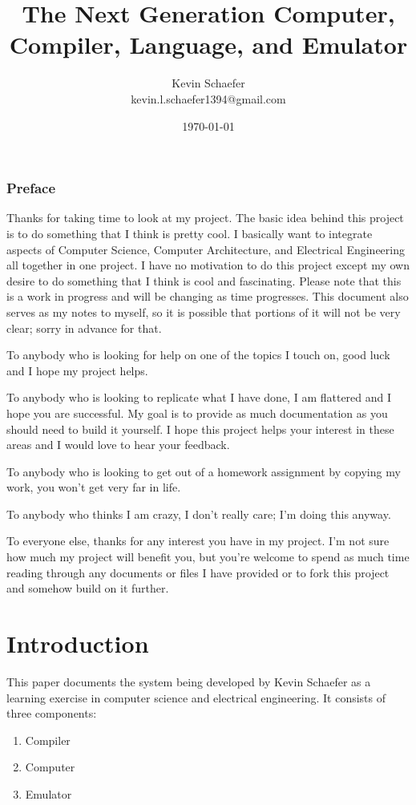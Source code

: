\documentclass{book}
\title{The Next Generation Computer, Compiler, Language, and Emulator}
\date{\today}
\author{Kevin Schaefer \\ kevin.l.schaefer1394@gmail.com}
\begin{document}
\maketitle

\subsection*{Preface}
Thanks for taking time to look at my project. The basic idea behind this
project is to do something that I think is pretty cool. I basically want
to integrate aspects of Computer Science, Computer Architecture, and
Electrical Engineering all together in one project. I have no motivation
to do this project except my own desire to do something that I think is
cool and fascinating. Please note that this is a work in progress and will
be changing as time progresses. This document also serves as my notes to
myself, so it is possible that portions of it will not be very clear;
sorry in advance for that.

To anybody who is looking for help on one of the topics I touch on,
good luck and I hope my project helps.

To anybody who is looking to replicate what I have done, I am flattered
and I hope you are successful. My goal is to provide as much documentation
as you should need to build it yourself. I hope this project helps your
interest in these areas and I would love to hear your feedback.

To anybody who is looking to get out of a homework assignment by
copying my work, you won't get very far in life.

To anybody who thinks I am crazy, I don't really care; I'm doing this
anyway.

To everyone else, thanks for any interest you have in my project. I'm
not sure how much my project will benefit you, but you're welcome to
spend as much time reading through any documents or files I have provided
or to fork this project and somehow build on it further.


\tableofcontents

\chapter{Introduction}
This paper documents the system being developed by Kevin Schaefer as a learning
exercise in computer science and electrical engineering. It consists of three
components:
\begin{enumerate}
  \item Compiler
  \item Computer
  \item Emulator
\end{enumerate}
\end{document}
